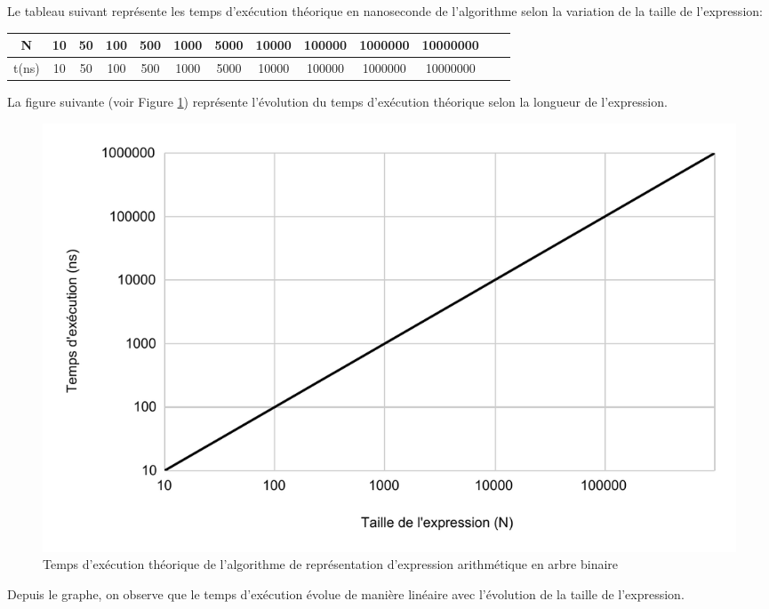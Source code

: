 Le tableau suivant représente les temps d'exécution théorique en nanoseconde de l'algorithme selon la variation de la taille de l'expression:

\small
\begin{center}
\begin{tabular}{| c | c | c | c | c | c | c | c | c | c | c | c | c |}
    \hline
    N & 10 & 50 & 100 & 500 & 1000 & 5000 & 10000 & 100000 & 1000000 & 10000000 \\
    \hline
    t(ns) & 10 & 50 & 100 & 500 & 1000 & 5000 & 10000 & 100000 & 1000000 & 10000000 \\
    \hline
\end{tabular}  
\end{center}

La figure suivante (voir Figure \ref{fig:temps_exec_th_algo2}) représente l'évolution du temps d'exécution théorique selon la longueur de l'expression.

\begin{figure}[H]
    \centering
        \includegraphics[scale=0.5]{./ressources/temps_execution_th_algo2.pdf}
        \caption{Temps d'exécution théorique de l'algorithme de représentation d'expression arithmétique en arbre binaire}
    \label{fig:temps_exec_th_algo2}
\end{figure} 

Depuis le graphe,  on observe que le temps d'exécution évolue de manière linéaire avec l'évolution de la taille de l'expression.

